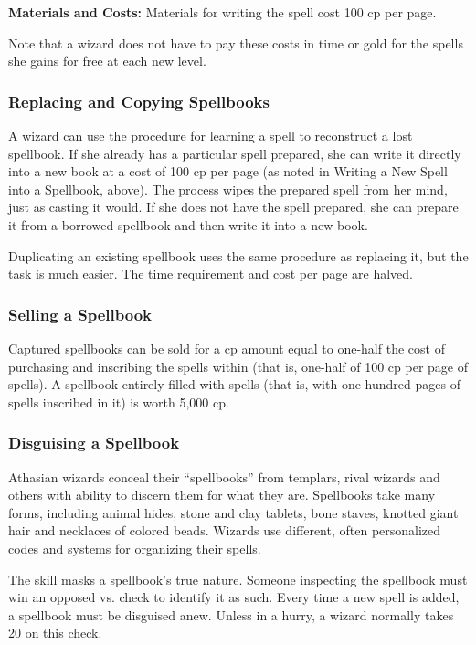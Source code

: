 \textbf{Materials and Costs:} Materials for writing the spell cost 100 cp per page.

Note that a wizard does not have to pay these costs in time or gold for the spells she gains for free at each new level.

\subsubsection{Replacing and Copying Spellbooks}
A wizard can use the procedure for learning a spell to reconstruct a lost spellbook. If she already has a particular spell prepared, she can write it directly into a new book at a cost of 100 cp per page (as noted in Writing a New Spell into a Spellbook, above). The process wipes the prepared spell from her mind, just as casting it would. If she does not have the spell prepared, she can prepare it from a borrowed spellbook and then write it into a new book.

Duplicating an existing spellbook uses the same procedure as replacing it, but the task is much easier. The time requirement and cost per page are halved.

\subsubsection{Selling a Spellbook}
Captured spellbooks can be sold for a cp amount equal to one-half the cost of purchasing and inscribing the spells within (that is, one-half of 100 cp per page of spells). A spellbook entirely filled with spells (that is, with one hundred pages of spells inscribed in it) is worth 5,000 cp.

\subsubsection{Disguising a Spellbook}
Athasian wizards conceal their ``spellbooks'' from templars, rival wizards and others with ability to discern them for what they are. Spellbooks take many forms, including animal hides, stone and clay tablets, bone staves, knotted giant hair and necklaces of colored beads. Wizards use different, often personalized codes and systems for organizing their spells.

The  skill masks a spellbook's true nature. Someone inspecting the spellbook must win an opposed  vs.  check to identify it as such. Every time a new spell is added, a spellbook must be disguised anew. Unless in a hurry, a wizard normally takes 20 on this check.